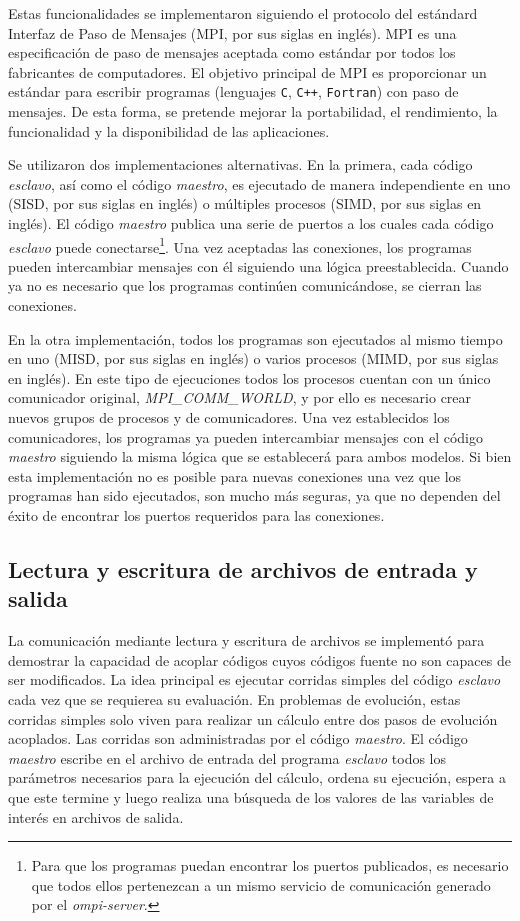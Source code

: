 Estas funcionalidades se implementaron siguiendo el protocolo del estándard Interfaz de Paso de Mensajes (MPI, por sus siglas en inglés). 
MPI es una especificación de paso de mensajes aceptada como estándar
por todos los fabricantes de computadores. 
El objetivo principal de MPI es proporcionar un estándar para escribir
programas (lenguajes \texttt{C}, \texttt{C++}, \texttt{Fortran}) con paso de mensajes. De esta forma, se
pretende mejorar la portabilidad, el rendimiento, la funcionalidad y
la disponibilidad de las aplicaciones.

Se utilizaron dos implementaciones alternativas.
En la primera, cada código \textit{esclavo}, así como el código \textit{maestro},
es ejecutado de manera independiente en uno (SISD, por sus siglas en inglés)
o múltiples procesos (SIMD, por sus siglas en inglés).
El código \textit{maestro} publica una serie de puertos a los cuales cada código \textit{esclavo} puede conectarse\footnote{
Para que los programas puedan encontrar los puertos publicados, es necesario que todos ellos pertenezcan a un mismo servicio de comunicación generado por el \textit{ompi-server}.
}.
Una vez aceptadas las conexiones, los programas pueden intercambiar mensajes con él siguiendo una lógica preestablecida.
Cuando ya no es necesario que los programas continúen comunicándose, se cierran las conexiones.

En la otra implementación, todos los programas son ejecutados al mismo tiempo en uno (MISD, por sus siglas en inglés)
o varios procesos (MIMD, por sus siglas en inglés).
En este tipo de ejecuciones todos los procesos cuentan con un único comunicador original, \textit{MPI\_COMM\_WORLD}, y por ello es necesario crear nuevos grupos de procesos y de comunicadores.
Una vez establecidos los comunicadores, los programas ya pueden intercambiar mensajes con el código \textit{maestro} siguiendo la misma lógica que se establecerá para ambos modelos.
Si bien esta implementación no es posible para nuevas conexiones una vez que los programas han sido ejecutados,
son mucho más seguras, ya que no dependen del éxito de encontrar los puertos requeridos para las conexiones.

\subsection*{Lectura y escritura de archivos de entrada y salida}
\label{2:io}

La comunicación mediante lectura y escritura de archivos se implementó para demostrar la capacidad de acoplar códigos cuyos códigos fuente no son capaces de ser modificados.
La idea principal es ejecutar corridas simples del código \textit{esclavo} cada vez que se requierea su evaluación.
En problemas de evolución, estas corridas simples solo viven para realizar un cálculo entre dos pasos de evolución acoplados.
Las corridas son administradas por el código \textit{maestro}.
El código \textit{maestro} escribe en el archivo de entrada del programa \textit{esclavo} todos los parámetros necesarios para la ejecución del cálculo,
ordena su ejecución, espera a que este termine y luego realiza una búsqueda de los valores de las variables de interés en archivos de salida.

